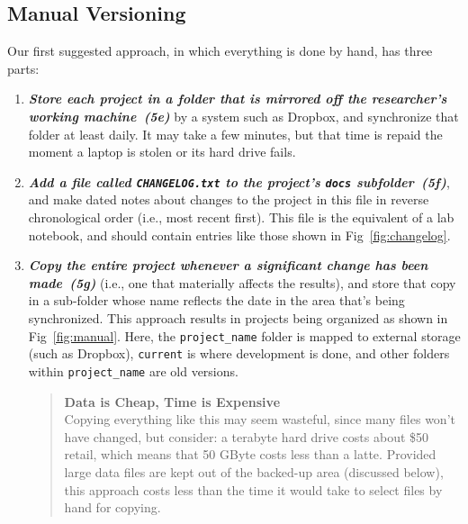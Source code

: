 \documentclass[10pt,letterpaper]{article}
\newcommand{\practice}[2]{\textbf{\emph{{#2}~({#1})}}}
\begin{document}
\subsection*{Manual Versioning}

Our first suggested approach, in which everything is done by hand, has
three parts:

\begin{enumerate}

\item
  \practice{5e}{Store each project in a folder that is mirrored off the
    researcher's working machine} by a system such as Dropbox, and
  synchronize that folder at least daily. It may take a few minutes,
  but that time is repaid the
  moment a laptop is stolen or its hard drive fails.

\item
  \practice{5f}{Add a file called \texttt{CHANGELOG.txt} to the project's
    \texttt{docs} subfolder}, and make dated notes about changes to
  the project in this file in reverse chronological order (i.e., most
  recent first). This file is the equivalent of a lab notebook, and
  should contain entries like those shown in
  Fig~\ref{fig:changelog}.

\item
  \practice{5g}{Copy the entire project whenever a significant change has
    been made} (i.e., one that materially affects the results), and store that
    copy in a sub-folder whose name reflects
  the date in the area that's being synchronized. This approach
  results in projects being organized as shown in
  Fig~\ref{fig:manual}.  Here, the \texttt{project\_name} folder is
  mapped to external storage (such as Dropbox), \texttt{current} is
  where development is done, and other folders within
  \texttt{project\_name} are old versions.

  \begin{quote}
    \noindent \textbf{Data is Cheap, Time is Expensive}
    \\
    Copying everything like this may seem wasteful, since many files
    won't have changed, but consider: a terabyte hard drive costs
    about \$50 retail, which means that 50 GByte costs less than a
    latte. Provided large data files are kept out of the backed-up
    area (discussed below), this approach costs less than the time it
    would take to select files by hand for copying.
  \end{quote}

\end{enumerate}
\end{document}
